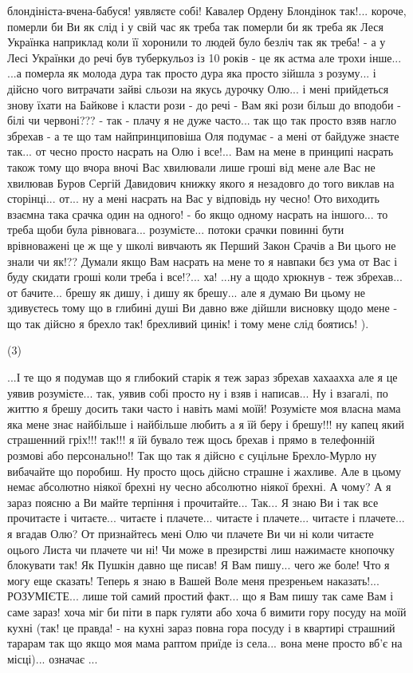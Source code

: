 блондініста-вчена-бабуся! уявляєте собі!  Кавалер Ордену Блондінок так!...
короче, померли би Ви як слід і у свій час як треба так померли би як треба як
Леся Українка наприклад коли її хоронили то людей було безліч так як треба! - а
у Лесі Українки до речі був туберкульоз із 10 років - це як астма але трохи
інше...  ...а померла як молода дура так просто дура яка просто зійшла з
розуму... і дійсно чого витрачати зайві сльози на якусь дурочку Олю... і мені
прийдеться знову їхати на Байкове і класти рози - до речі - Вам які рози більш
до вподоби - білі чи червоні??? - так - плачу я не дуже часто... так що так
просто взяв нагло збрехав - а те що там найпринциповіша Оля подумає - а мені от
байдуже знаєте так... от чесно просто насрать на Олю і все!... Вам на мене в
принципі насрать також тому що вчора вночі Вас хвилювали лише гроші від мене
але Вас не хвилював Буров Сергій Давидович книжку якого я незадовго до того
виклав на сторінці... от... ну а мені насрать на Вас у відповідь ну чесно! Ото
виходить взаємна така срачка один на одного! - бо якщо одному насрать на
іншого... то треба щоби була рівновага... розумієте...  потоки срачки повинні
бути врівноважені це ж ще у школі вивчають як Перший Закон Срачів а Ви цього не
знали чи як!?? Думали якщо Вам насрать на мене то я навпаки бєз ума от Вас і
буду скидати гроші коли треба і все!?... ха!  ...ну а щодо хрюкнув - теж
збрехав... от бачите... брешу як дишу, і дишу як брешу... але я думаю Ви цьому
не здивуєтесь тому що в глибині душі Ви давно вже дійшли висновку щодо мене -
що так дійсно я брехло так! брехливий цинік! і тому мене слід боятись! ).  

(3)

...І те що я подумав що я глибокий старік я теж зараз збрехав хахаахха але я це
уявив розумієте... так, уявив собі просто ну і взяв і написав... Ну і взагалі,
по життю я брешу досить таки часто і навіть мамі моїй!  Розумієте моя власна
мама яка мене знає найбільше і найбільше любить а я їй беру і брешу!!! ну капец
який страшенний гріх!!! так!!!  я їй бувало теж щось брехав і прямо в
телефонній розмові або персонально!!  Так що так я дійсно є суцільне
Брехло-Мурло ну вибачайте що поробиш. Ну просто щось дійсно страшне і жахливе.
Але в цьому немає абсолютно ніякої брехні ну чесно абсолютно ніякої брехні. А
чому? А я зараз поясню а Ви майте терпіння і прочитайте... Так... Я знаю Ви і
так все прочитаєте і читаєте...  читаєте і плачете... читаєте і плачете...
читаєте і плачете... я вгадав Олю? От признайтесь мені Олю чи плачете Ви чи ні
коли читаєте оцього Листа чи плачете чи ні! Чи може в презирстві лиш нажимаєте
кнопочку блокувати так!  Як Пушкін давно ще писав! Я Вам пишу... чего же боле!
Что я могу еще сказать! Теперь я знаю в Вашей Воле меня презреньем наказать!...
РОЗУМІЄТЕ... лише той самий простий факт... що я Вам пишу так саме Вам і саме
зараз! хоча міг би піти в парк гуляти або хоча б вимити гору посуду на моїй
кухні (так! це правда! - на кухні зараз повна гора посуду і в квартирі страшний
тарарам так що якщо моя мама раптом приїде із села... вона мене просто вб'є на
місці)... означає ... 

